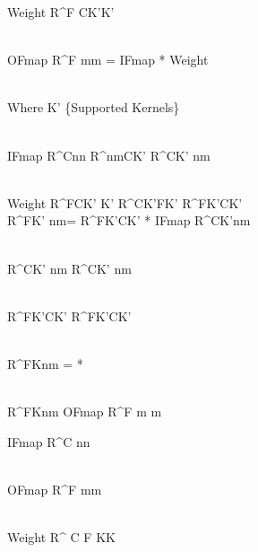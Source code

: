 Weight \in R^{F \times C\times K'\times K'} 

\\

OFmap \in  R^{F \times m\times m} = IFmap * Weight

\\

Where \space K' \notin \{Supported Kernels\}

\\

IFmap \in R^{C\times n\times n}   \in R^{nm\times CK'}   \in R^{CK' \times nm}

\\ 

Weight \in R^{F\times C\times K' \times K'}   \in R^{CK'\times FK'}   \in R^{FK'\times CK'}
\\

 \in R^{FK' \times nm}=  \in R^{FK'\times CK'} * IFmap \in R^{CK'\times nm} 

\\

 \in R^{CK' \times nm}   \in R^{CK' \times nm }

\\ 

 \in R^{FK'\times CK'}   \in R^{FK'\times CK'  }

\\

 \in R^{FK\times nm } = *

\\

 \in R^{FK\times nm }  OFmap \in R^{F \times m \times m}



IFmap \in R^{C \times n\times n}

\\

OFmap \in  R^{F \times m\times m}

\\

Weight \in R^{ C \times F \times K\times K} 

\\

